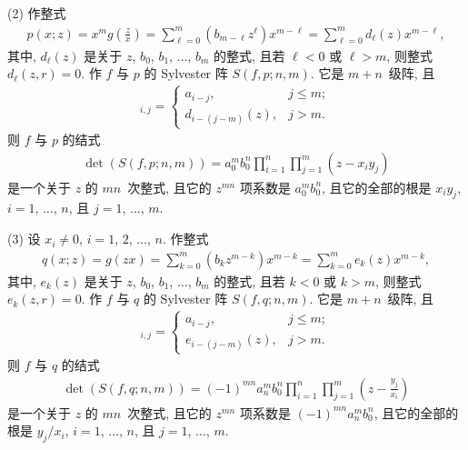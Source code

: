 \documentclass[../libro.tex]{subfiles}
\begin{document}
\begin{theorem}
    (2)
    作整式
    \begin{align*}
        p(x; z)
        = x^m g\left(\frac{z}{x}\right)
        = \sum_{\ell = 0}^{m} {(b_{m-\ell} z^\ell) x^{m-\ell}}
        = \sum_{\ell = 0}^{m} {d_\ell (z) x^{m-\ell}},
    \end{align*}
    其中, \(d_\ell (z)\) 是关于
    \(z\), \(b_0\), \(b_1\), \(\dots\), \(b_m\)
    的整式,
    且若 \(\ell < 0\) 或 \(\ell > m\),
    则整式 \(d_\ell (z, r) = 0\).
    作 \(f\) 与 \(p\) 的 Sylvester 阵 \(S(f, p; n, m)\).
    它是 \(m + n\)~级阵, 且
    \begin{align*}
        [S(f, p; n, m)]_{i,j} =
        \begin{cases}
            a_{i-j},         & j \leq m; \\
            d_{i-(j-m)} (z), & j > m.
        \end{cases}
    \end{align*}
    则 \(f\) 与 \(p\) 的结式
    \begin{align*}
        \det {(S(f, p; n, m))}
        = a_0^m b_0^n
        \prod_{i = 1}^{n} \prod_{j = 1}^{m}
        {(z - x_i y_j)}
    \end{align*}
    是一个关于 \(z\) 的 \(m n\)~次整式,
    且它的 \(z^{m n}\) 项系数是 \(a_0^m b_0^n\),
    且它的全部的根是 \(x_i y_j\),
    \(i = 1\), \(\dots\), \(n\),
    且 \(j = 1\), \(\dots\), \(m\).

    (3)
    设 \(x_i \neq 0\), \(i = 1\), \(2\), \(\dots\), \(n\).
    作整式
    \begin{align*}
        q(x; z)
        = g (z x)
        = \sum_{k = 0}^{m} (b_k z^{m-k}) x^{m-k}
        = \sum_{k = 0}^{m} {e_k (z) x^{m-k}},
    \end{align*}
    其中, \(e_k (z)\) 是关于
    \(z\), \(b_0\), \(b_1\), \(\dots\), \(b_m\)
    的整式,
    且若 \(k < 0\) 或 \(k > m\),
    则整式 \(e_k (z, r) = 0\).
    作 \(f\) 与 \(q\) 的 Sylvester 阵 \(S(f, q; n, m)\).
    它是 \(m + n\)~级阵, 且
    \begin{align*}
        [S(f, q; n, m)]_{i,j} =
        \begin{cases}
            a_{i-j},         & j \leq m; \\
            e_{i-(j-m)} (z), & j > m.
        \end{cases}
    \end{align*}
    则 \(f\) 与 \(q\) 的结式
    \begin{align*}
        \det {(S(f, q; n, m))}
        = (-1)^{m n} a_n^m b_0^n
        \prod_{i = 1}^{n} \prod_{j = 1}^{m}
        {\left( z - \frac{y_j}{x_i} \right)}
    \end{align*}
    是一个关于 \(z\) 的 \(m n\)~次整式,
    且它的 \(z^{m n}\) 项系数是 \((-1)^{m n} a_n^m b_0^n\),
    且它的全部的根是 \(y_j / x_i\),
    \(i = 1\), \(\dots\), \(n\),
    且 \(j = 1\), \(\dots\), \(m\).
\end{theorem}
\end{document}
